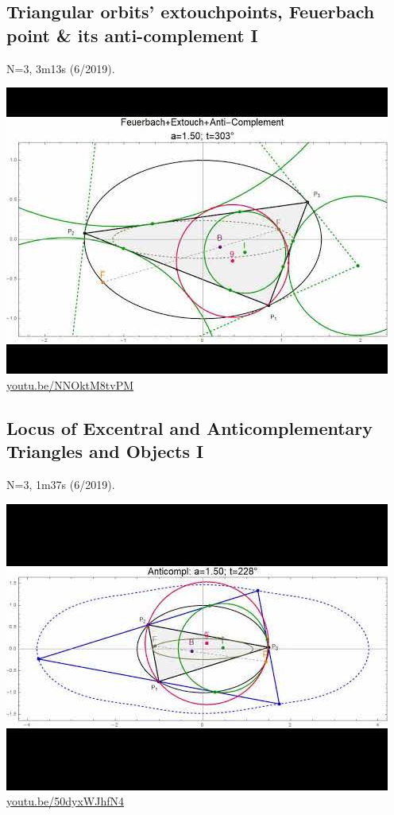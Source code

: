 \documentclass[12pt]{amsart}
\begin{document}
\subsection{Triangular orbits' extouchpoints, Feuerbach point \& its anti-complement I}
\label{vid:NNOktM8tvPM}
\noindent N=3, 3m13s (6/2019). 
\begin{center}\includegraphics[width=.5\textwidth]{pics/NNOktM8tvPM.jpg} \\ 
\href{https://youtu.be/NNOktM8tvPM}{\url{youtu.be/NNOktM8tvPM}}\end{center}
% 

\subsection{Locus of Excentral and Anticomplementary Triangles and Objects I}
\label{vid:50dyxWJhfN4}
\noindent N=3, 1m37s (6/2019). 
\begin{center}\includegraphics[width=.5\textwidth]{pics/50dyxWJhfN4.jpg} \\ 
\href{https://youtu.be/50dyxWJhfN4}{\url{youtu.be/50dyxWJhfN4}}\end{center}
% 
\end{document}
